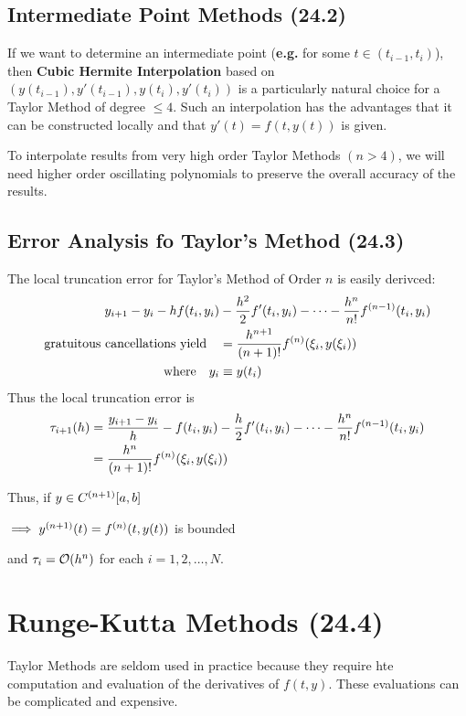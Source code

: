 \documentclass[12pt]{article}
\newcommand{\eg}{\textbf{e.g.}\xspace}
\begin{document}
\subsection{Intermediate Point Methods (24.2)}
If we want to determine an intermediate point (\eg for some
$t\in(t_{i-1},t_i)$), then \textbf{Cubic Hermite Interpolation} based on
$(y(t_{i-1}), y'(t_{i-1}), y(t_i), y'(t_i))$ is a particularly natural choice
for a Taylor Method of degree $\leq 4$. Such an interpolation has the advantages
that it can be constructed locally and that $y'(t) = f(t,y(t))$ is given.

To interpolate results from very high order Taylor Methods $(n>4)$, we will need
higher order oscillating polynomials to preserve the overall accuracy of the
results.

\subsection{Error Analysis fo Taylor's Method (24.3)}
The local truncation error for Taylor's Method of Order $n$ is easily derivced:
\begin{align*}
  y_{i+1} - y_i - h f\pqty{t_i, y_i} 
    &- \frac{h^2}{2} f'\pqty{t_i, y_i} 
    - \cdots 
    - \frac{h^n}{n!} f^{(n-1)}\pqty{t_i, y_i} \\
    \text{gratuitous cancellations yield}\quad &= \frac{h^{n+1}}{(n+1)!} f^{(n)}\pqty{\xi_i, y\pqty{\xi_i}} \\
  \text{where} \quad y_i &\equiv y\pqty{t_i}
\end{align*}
Thus the local truncation error is
\begin{align*}
  \tau_{i+1}(h) &= \frac{y_{i+1} - y_i}{h} - f\pqty{t_i, y_i} - \frac{h}{2} f'\pqty{t_i, y_i} - \cdots - \frac{h^n}{n!} f^{(n-1)}\pqty{t_i, y_i} \\
                &= \frac{h^n}{(n+1)!} f^{(n)}\pqty{\xi_i, y\pqty{\xi_i}} \\
\end{align*}
{
  Thus, if
  $y \in C^{(n+1)}\bqty{a, b}$

  \hangindent=0.5in
  $\implies y^{(n+1)}(t) = f^{(n)}\pqty{t, y(t)}$ is bounded

  and $\tau_i = \order{h^n}$ for each $i = 1, 2, \dots, N.$
}

\section{Runge-Kutta Methods (24.4)}
Taylor Methods are seldom used in practice because they require hte computation
and evaluation of the derivatives of $f(t,y)$. These evaluations can be
complicated and expensive.
\end{document}
